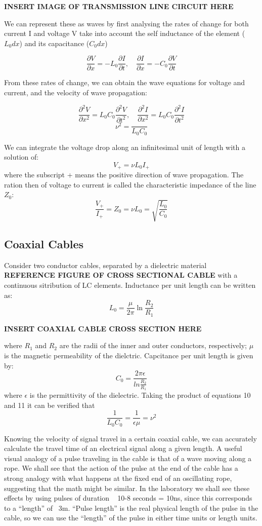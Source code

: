 \documentclass{article} %
\begin{document}
\textbf{INSERT IMAGE OF TRANSMISSION LINE CIRCUIT HERE}

We can represent these as waves by first analysing the rates of change for both current I and voltage V take into account the self inductance of the element ($L_0dx$) and its capacitance ($C_0dx$)

\[
\frac{\partial V}{\partial x} = -L_0\frac{\partial I}{\partial t}, \quad \frac{\partial I}{\partial x} = -C_0\frac{\partial V}{\partial t}
\]

From these rates of change, we can obtain the wave equations for voltage and current, and the velocity of wave propagation:

\[
\frac{\partial^2 V}{\partial x^2} = L_0C_0\frac{\partial^2 V}{\partial t^2}, \quad \frac{\partial^2 I}{\partial x^2} = L_0C_0\frac{\partial^2 I}{\partial t^2}
\]
\[
\nu^2 = \frac{}{L_0 C_0}
\]

We can integrate the voltage drop along an infinitesimal unit of length with a solution of:
\[
V_+ = \nu L_0I_+
\]
where the subscript + means the positive direction of wave propagation.
The ration then of voltage to current is called the characteristic impedance of the line $Z_0$:
\[
\frac{V_+}{I_+} = Z_0 = \nu L_0 = \sqrt{\frac{L_0}{C_0}}
\]

\subsection{Coaxial Cables}

Consider two conductor cables, separated by a dielectric material \textbf{REFERENCE FIGURE OF CROSS SECTIONAL CABLE} with a continuous sitribution of LC elements. 
Inductance per unit length can be written as:
\[
L_0 = \frac{\mu}{2\pi}\ln\frac{R_2}{R_1}
\] 

\textbf{INSERT COAXIAL CABLE CROSS SECTION HERE}

where $R_1$ and $R_2$ are the radii of the inner and outer conductors, respectively; $\mu$ is the magnetic permeability of the dielctric.
Capcitance per unit length is given by:
\[
C_0 = \frac{2\pi\epsilon}{ln\frac{R_2}{R_1}}
\]
where $\epsilon$ is the permittivity of the dielectric.
Taking the product of equations 10 and 11 it can be verified that
\[
\frac{1}{L_0C_0} = \frac{1}{\epsilon\mu} = \nu^2
\]

Knowing the velocity of signal travel in a certain coaxial cable, we can accurately calculate the travel time of an electrical signal along a given length.
A useful visual analogy of a pulse traveling in the cable is that of a wave moving along a rope. 
We shall see that the action of the pulse at the end of the cable has a strong analogy with what happens at the fixed end of an oscillating rope, suggesting that the math might be similar.
In the laboratory we shall see these effects by using pulses of duration ~ 10-8 seconds = 10ns, since this corresponds to a “length” of ~3m.
“Pulse length” is the real physical length of the pulse in the cable, so we can use the “length” of the pulse in either time units or length units.
\end{document}
